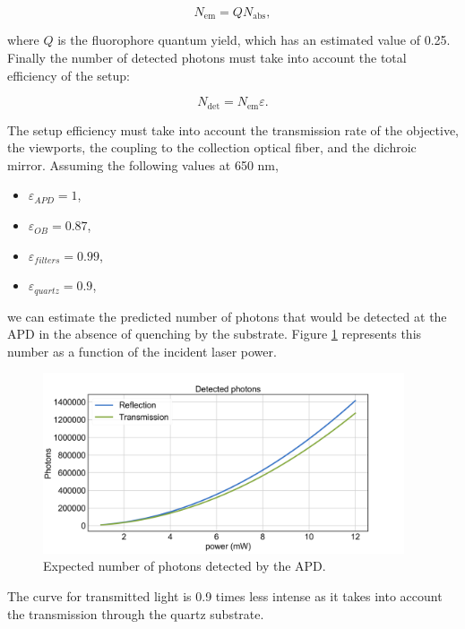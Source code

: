 \documentclass{article}
\begin{document}
$$N_{\mathrm{em}} = Q N_{\mathrm{abs}}, $$

where $Q$ is the fluorophore quantum yield, which has an estimated value of 0.25. Finally the number of detected photons must take into account the total efficiency of the setup:

$$N_{\mathrm{det}} = N_{\mathrm{em}} \varepsilon. $$

The setup efficiency must take into account the transmission rate of the objective, the viewports, the coupling to the collection optical fiber, and the dichroic mirror. Assuming the following values at 650 nm,
\begin{itemize}
    \item $\varepsilon_{APD} = 1$,
    \item $\varepsilon_{OB} = 0.87$,
    \item $\varepsilon_{filters} = 0.99$,
    \item $\varepsilon_{quartz} = 0.9$,
\end{itemize}

we can estimate the predicted number of photons that would be detected at the APD in the absence of quenching by the substrate. Figure \ref{detectedPhotons} represents this number as a function of the incident laser power.

\begin{figure}[ht!]
	\includegraphics[width=0.95\textwidth]{figures/detectedPhot.png}
	\caption{\label{detectedPhotons} Expected number of photons detected by the APD.}
\end{figure}

The curve for transmitted light is 0.9 times less intense as it takes into account the transmission through the quartz substrate.


\end{document}
